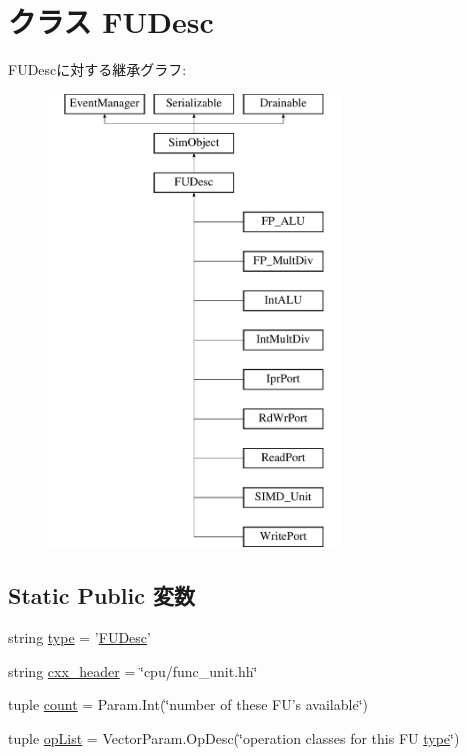 \hypertarget{classFuncUnit_1_1FUDesc}{
\section{クラス FUDesc}
\label{classFuncUnit_1_1FUDesc}
}
FUDescに対する継承グラフ:\begin{figure}[H]
\begin{center}
\leavevmode
\includegraphics[height=12cm]{classFuncUnit_1_1FUDesc}
\end{center}
\end{figure}
\subsection*{Static Public 変数}
\begin{DoxyCompactItemize}
\item 
string \hyperlink{classFuncUnit_1_1FUDesc_acce15679d830831b0bbe8ebc2a60b2ca}{type} = '\hyperlink{classFuncUnit_1_1FUDesc}{FUDesc}'
\item 
string \hyperlink{classFuncUnit_1_1FUDesc_a17da7064bc5c518791f0c891eff05fda}{cxx\_\-header} = \char`\"{}cpu/func\_\-unit.hh\char`\"{}
\item 
tuple \hyperlink{classFuncUnit_1_1FUDesc_adf167b42e49fa9d4114bff901e1b1c29}{count} = Param.Int(\char`\"{}number of these FU's available\char`\"{})
\item 
tuple \hyperlink{classFuncUnit_1_1FUDesc_aa7a0c51c9e0149c27f9e38f86005dfbe}{opList} = VectorParam.OpDesc(\char`\"{}operation classes for this FU \hyperlink{classFuncUnit_1_1FUDesc_acce15679d830831b0bbe8ebc2a60b2ca}{type}\char`\"{})
\end{DoxyCompactItemize}


